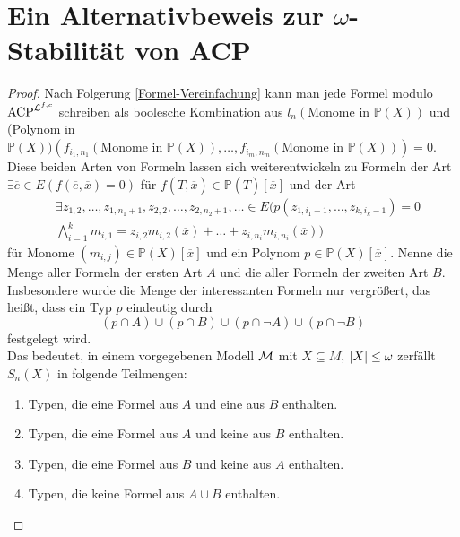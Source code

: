 \renewcommand\thesection{\Alph{section}}
\section{Ein Alternativbeweis zur $\omega$-Stabilität von ACP}

\begin{proof}
	Nach Folgerung \ref{Formel-Vereinfachung} kann man jede Formel modulo $\operatorname{ACP}^{\mathcal{L}^{f,c}}$ schreiben als boolesche Kombination aus \glqq{}$l_n(\text{Monome in }\mathbb{P}(X))$\grqq{} und\\
	\glqq{}(Polynom in $\mathbb{P}(X))(f_{i_1,n_1}(\text{Monome in }\mathbb{P}(X)),\dots,f_{i_m,n_m}(\text{Monome in }\mathbb{P}(X)))=0$\grqq{}.\\
	Diese beiden Arten von Formeln lassen sich weiterentwickeln zu Formeln der Art ${\exists\overline{e}\in E(f(\overline{e},\overline{x})=0)}$ für  $f(\overline{T},\overline{x})\in\mathbb{P}(\overline{T})[\overline{x}]$ und der Art
	\begin{align*}
	&\exists z_{1,2},\dots,z_{1,n_1+1},z_{2,2},\dots,z_{2,n_2+1},\dots\in E(p(z_{1,i_1-1},\dots,z_{k,i_k-1})=0\\
	&\bigwedge\limits_{i=1}^km_{i,1}=z_{i,2}m_{i,2}(\overline{x})+\dots+z_{i,n_i}m_{i,n_i}(\overline{x}))
	\end{align*}
	für Monome $(m_{i,j})\in\mathbb{P}(X)[\overline{x}]$ und ein Polynom $p\in\mathbb{P}(X)[\overline{x}]$. Nenne die Menge aller Formeln der ersten Art $A$ und die aller Formeln der zweiten Art $B$. Insbesondere wurde die Menge der \glqq{}interessanten\grqq{} Formeln nur vergrößert, das heißt, dass ein Typ $p$ eindeutig durch $$(p\cap A)\cup(p\cap B)\cup(p\cap\neg A)\cup(p\cap\neg B)$$ festgelegt wird.\\
	Das bedeutet, in einem vorgegebenen Modell $\mathcal{M}$ mit $X\subseteq M$, ${\left| X \right|}\leq\omega$ zerfällt $S_n(X)$ in folgende Teilmengen:\\
	\begin{enumerate}
		\item Typen, die eine Formel aus $A$ und eine aus $B$ enthalten.
		\item Typen, die eine Formel aus $A$ und keine aus $B$ enthalten.
		\item Typen, die eine Formel aus $B$ und keine aus $A$ enthalten.
		\item Typen, die keine Formel aus $A\cup B$ enthalten.
	\end{enumerate}

\end{proof}
